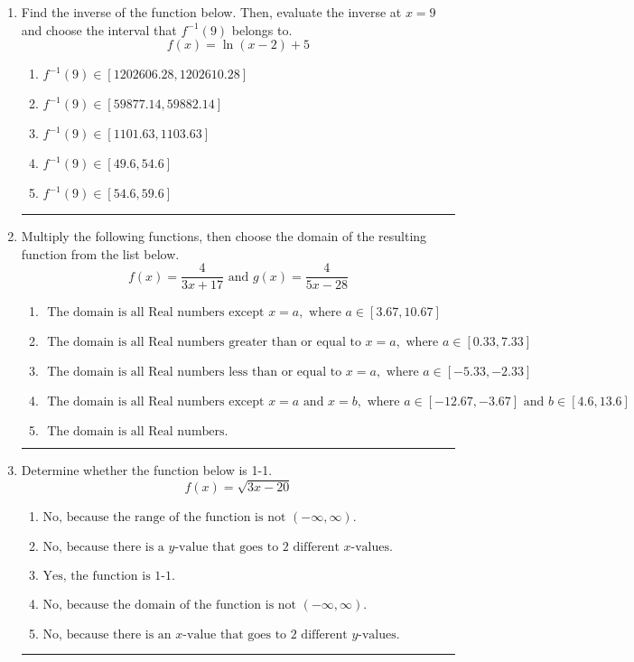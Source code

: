 \documentclass[14pt]{extbook}
\newcommand{\litem}[1]{\item#1\hspace*{-1cm}\rule{\textwidth}{0.4pt}}
\begin{document}
\begin{enumerate}
{\begin{enumerate}[label=\Alph*.]
\end{enumerate} }
\litem{
Find the inverse of the function below. Then, evaluate the inverse at $x = 9$ and choose the interval that $f^{-1}(9)$ belongs to.\[ f(x) = \ln{(x-2)}+5 \]\begin{enumerate}[label=\Alph*.]
\item \( f^{-1}(9) \in [1202606.28, 1202610.28] \)
\item \( f^{-1}(9) \in [59877.14, 59882.14] \)
\item \( f^{-1}(9) \in [1101.63, 1103.63] \)
\item \( f^{-1}(9) \in [49.6, 54.6] \)
\item \( f^{-1}(9) \in [54.6, 59.6] \)

\end{enumerate} }
\litem{
Multiply the following functions, then choose the domain of the resulting function from the list below.\[ f(x) = \frac{4}{3x+17} \text{ and } g(x) = \frac{4}{5x-28} \]\begin{enumerate}[label=\Alph*.]
\item \( \text{ The domain is all Real numbers except } x = a, \text{ where } a \in [3.67, 10.67] \)
\item \( \text{ The domain is all Real numbers greater than or equal to } x = a, \text{ where } a \in [0.33, 7.33] \)
\item \( \text{ The domain is all Real numbers less than or equal to } x = a, \text{ where } a \in [-5.33, -2.33] \)
\item \( \text{ The domain is all Real numbers except } x = a \text{ and } x = b, \text{ where } a \in [-12.67, -3.67] \text{ and } b \in [4.6, 13.6] \)
\item \( \text{ The domain is all Real numbers. } \)

\end{enumerate} }
\litem{
Determine whether the function below is 1-1.\[ f(x) = \sqrt{3 x - 20} \]\begin{enumerate}[label=\Alph*.]
\item \( \text{No, because the range of the function is not $(-\infty, \infty)$.} \)
\item \( \text{No, because there is a $y$-value that goes to 2 different $x$-values.} \)
\item \( \text{Yes, the function is 1-1.} \)
\item \( \text{No, because the domain of the function is not $(-\infty, \infty)$.} \)
\item \( \text{No, because there is an $x$-value that goes to 2 different $y$-values.} \)

\end{enumerate} }
\end{enumerate}
\end{document}
